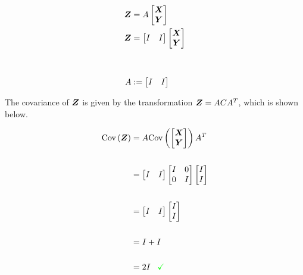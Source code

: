 \begin{align*}
	\boldsymbol{Z} &= A \begin{bmatrix} \boldsymbol{X} \\ \boldsymbol{Y} \end{bmatrix}
	\\
	\boldsymbol{Z} &= \begin{bmatrix} I & I \end{bmatrix} \begin{bmatrix} \boldsymbol{X} \\ \boldsymbol{Y} \end{bmatrix}
	\\
	\\
	\\
	A &\vcentcolon= \begin{bmatrix} I & I \end{bmatrix}
\end{align*}

The covariance of $\boldsymbol{Z}$ is given by the transformation $\boldsymbol{Z} = A C A^T$, which is shown below.

\begin{align*}
	\textrm{Cov}\left(\boldsymbol{Z}\right) &= A \textrm{Cov}\left(\begin{bmatrix} \boldsymbol{X} \\ \boldsymbol{Y} \end{bmatrix}\right) A^T \\
	\\
	&= \begin{bmatrix} I & I \end{bmatrix} \begin{bmatrix} I & 0 \\ 0 & I \end{bmatrix} \begin{bmatrix} I \\ I \end{bmatrix} \\
	\\
	&= \begin{bmatrix} I & I \end{bmatrix} \begin{bmatrix} I \\ I \end{bmatrix} \\
	\\
	&= I + I \\
	\\
	&= 2I \,\,\,\,\, \textcolor{green}{\checkmark}
\end{align*}